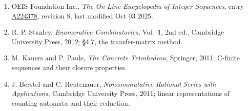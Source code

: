 \documentclass[11pt]{article}
\theoremstyle{definition}
\begin{document}
\begin{enumerate}

\item OEIS Foundation Inc., \emph{The On-Line Encyclopedia of Integer Sequences}, entry \href{https://oeis.org/A224378}{A224378}, revision 8, last modified Oct 03 2025.

\item R. P. Stanley, \emph{Enumerative Combinatorics}, Vol.~1, 2nd ed., Cambridge University Press, 2012; \S4.7, the transfer-matrix method.

\item M. Kauers and P. Paule, \emph{The Concrete Tetrahedron}, Springer, 2011; C-finite sequences and their closure properties.

\item J. Berstel and C. Reutenauer, \emph{Noncommutative Rational Series with Applications}, Cambridge University Press, 2011; linear representations of counting automata and their reduction.

\end{enumerate}
\end{document}
